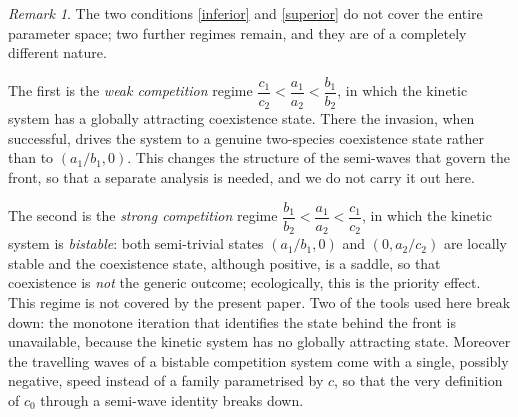 \documentclass[reqno]{amsart}
\newcommand{\rev}[1]{#1}
\theoremstyle{plain}
\theoremstyle{definition}
\theoremstyle{remark}
\newtheorem{remark}{Remark}
\begin{document}
	\begin{remark}
		The two conditions \eqref{inferior} and \eqref{superior} do not cover the entire parameter space; \rev{two further regimes remain, and they are of a completely different nature.}

		\rev{The first is the \emph{weak competition} regime $\dfrac{c_1}{c_2} < \dfrac{a_1}{a_2} < \dfrac{b_1}{b_2}$, in which the kinetic system has a globally attracting coexistence state. There the invasion, when successful, drives the system to a genuine
		two-species coexistence state rather than to $(a_1/b_1,0)$. This changes the
		structure of the semi-waves that govern the front, so that a separate
		analysis is needed, and we do not carry it out here.}

		\rev{The second is the \emph{strong competition} regime $\dfrac{b_1}{b_2} < \dfrac{a_1}{a_2} < \dfrac{c_1}{c_2}$, in which the kinetic system is \emph{bistable}: both semi-trivial states $(a_1/b_1,0)$ and $(0,a_2/c_2)$ are locally stable and the coexistence state, although positive, is a saddle, so that coexistence is \emph{not} the generic outcome; ecologically, this is the priority effect. This regime is not covered by the present paper. Two of the
		tools used here break down: the monotone iteration that identifies the state
		behind the front is unavailable, because the kinetic system has no globally
		attracting state. Moreover the travelling waves of a bistable competition
		system come with a single, possibly negative, speed instead of a family
		parametrised by $c$, so that the very definition of $c_0$ through a
		semi-wave identity breaks down.}
	\end{remark}
	
\end{document}
